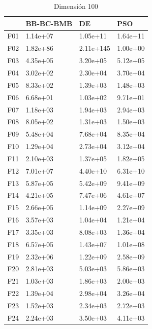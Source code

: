 \begin{table}[H]
\begin{minipage}{.5\linewidth}
    \end{minipage}%
    \begin{minipage}{.5\linewidth}
      \centering
      \caption{Dimensión 100}
      \begin{tabular}{llll}
        \toprule
        {} & BB-BC-BMB &         DE &       PSO \\
        \midrule
        F01  &  1.14e+07 &   1.05e+11 &  1.64e+11 \\
        F02  &  1.82e+86 &  2.11e+145 &  1.00e+00 \\
        F03  &  4.35e+05 &   3.20e+05 &  5.12e+05 \\
        F04  &  3.02e+02 &   2.30e+04 &  3.70e+04 \\
        F05  &  8.33e+02 &   1.39e+03 &  1.48e+03 \\
        F06  &  6.68e+01 &   1.03e+02 &  9.71e+01 \\
        F07  &  1.18e+03 &   1.94e+03 &  2.94e+03 \\
        F08  &  8.05e+02 &   1.31e+03 &  1.50e+03 \\
        F09  &  5.48e+04 &   7.68e+04 &  8.35e+04 \\
        F10  &  1.29e+04 &   2.73e+04 &  3.12e+04 \\
        F11  &  2.10e+03 &   1.37e+05 &  1.82e+05 \\
        F12  &  7.01e+07 &   4.40e+10 &  6.31e+10 \\
        F13  &  5.87e+05 &   5.42e+09 &  9.41e+09 \\
        F14  &  4.21e+05 &   7.47e+06 &  4.61e+07 \\
        F15  &  2.66e+05 &   1.14e+09 &  2.27e+09 \\
        F16  &  3.57e+03 &   1.04e+04 &  1.21e+04 \\
        F17  &  3.35e+03 &   8.08e+03 &  1.36e+04 \\
        F18  &  6.57e+05 &   1.43e+07 &  1.01e+08 \\
        F19  &  2.32e+06 &   1.22e+09 &  2.58e+09 \\
        F20  &  2.81e+03 &   5.03e+03 &  5.86e+03 \\
        F21  &  1.03e+03 &   1.86e+03 &  2.00e+03 \\
        F22  &  1.39e+04 &   2.98e+04 &  3.26e+04 \\
        F23  &  1.52e+03 &   2.34e+03 &  2.72e+03 \\
        F24  &  2.24e+03 &   3.50e+03 &  4.11e+03 \\

\end{tabular}
\end{minipage}
\end{table}
